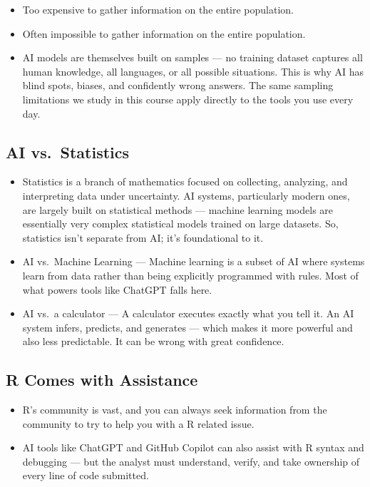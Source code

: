\documentclass[
  letterpaper,
  DIV=11,
  numbers=noendperiod]{scrreprt}
\providecommand{\tightlist}{%
  \setlength{\itemsep}{0pt}\setlength{\parskip}{0pt}}\usepackage{longtable,booktabs,array}
\begin{document}
\begin{itemize}
\tightlist
\item
  Too expensive to gather information on the entire population.
\item
  Often impossible to gather information on the entire population.
\item
  AI models are themselves built on samples --- no training dataset
  captures all human knowledge, all languages, or all possible
  situations. This is why AI has blind spots, biases, and confidently
  wrong answers. The same sampling limitations we study in this course
  apply directly to the tools you use every day.
\end{itemize}

\subsection{AI vs.~Statistics}\label{ai-vs.-statistics}

\begin{itemize}
\tightlist
\item
  Statistics is a branch of mathematics focused on collecting,
  analyzing, and interpreting data under uncertainty. AI systems,
  particularly modern ones, are largely built on statistical methods ---
  machine learning models are essentially very complex statistical
  models trained on large datasets. So, statistics isn't separate from
  AI; it's foundational to it.
\item
  AI vs.~Machine Learning --- Machine learning is a subset of AI where
  systems learn from data rather than being explicitly programmed with
  rules. Most of what powers tools like ChatGPT falls here.
\item
  AI vs.~a calculator --- A calculator executes exactly what you tell
  it. An AI system infers, predicts, and generates --- which makes it
  more powerful and also less predictable. It can be wrong with great
  confidence.
\end{itemize}

\subsection{R Comes with Assistance}\label{r-comes-with-assistance}

\begin{itemize}
\tightlist
\item
  R's community is vast, and you can always seek information from the
  community to try to help you with a R related issue.
\item
  AI tools like ChatGPT and GitHub Copilot can also assist with R syntax
  and debugging --- but the analyst must understand, verify, and take
  ownership of every line of code submitted.
\end{itemize}
\end{document}
